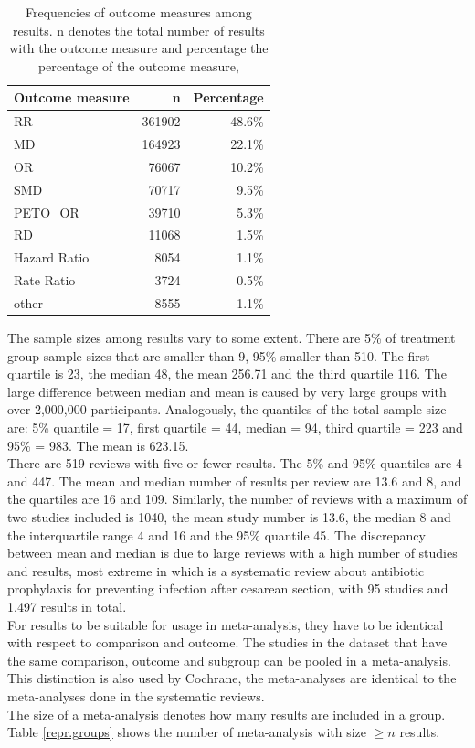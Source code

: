 \documentclass[11pt,a4paper,twoside]{book}\usepackage[]{graphicx}\usepackage[]{color}
\begin{document}
\begin{table}[ht]
\centering
\begingroup\footnotesize
\begin{tabular}{lrr}
  \hline
Outcome measure & n & Percentage \\ 
  \hline
RR & 361902 & 48.6\% \\ 
  MD & 164923 & 22.1\% \\ 
  OR & 76067 & 10.2\% \\ 
  SMD & 70717 & 9.5\% \\ 
  PETO\_OR & 39710 & 5.3\% \\ 
  RD & 11068 & 1.5\% \\ 
  Hazard Ratio & 8054 & 1.1\% \\ 
  Rate Ratio & 3724 & 0.5\% \\ 
  other & 8555 & 1.1\% \\ 
   \hline
\end{tabular}
\endgroup
\caption{Frequencies of outcome measures among results. n denotes the total number 
             of results with the outcome measure and percentage the percentage of the outcome measure,} 
\label{outcome.measure.frequencies}
\end{table}



The sample sizes among results vary to some extent. There are 5\% of treatment group sample sizes that are smaller than 9, 95\% smaller than 510. The first quartile is 23, the median 48, the mean 256.71 and the third quartile 116. The large difference between median and mean is caused by very large groups with over 2,000,000 participants. Analogously, the quantiles of the total sample size are: 5\% quantile = 17, first quartile = 44, median = 94, third quartile = 223 and 95\% = 983. The mean is 623.15. \\
There are 519 reviews with five or fewer results. The 5\% and 95\% quantiles are 4 and 447. The mean and median number of results per review are 13.6 and 8, and the quartiles are 16 and 109. Similarly, the number of reviews with a maximum of two studies included is 1040, the mean study number is 13.6, the median 8 and the interquartile range 4 and 16 and the 95\% quantile 45. The discrepancy between mean and median is due to large reviews with a high number of studies and results, most extreme in %
which is a systematic review about antibiotic prophylaxis for preventing infection after cesarean section, with 95 studies and 1,497 results in total.\\
For results to be suitable for usage in meta-analysis, they have to be identical with respect to comparison and outcome. The studies in the dataset that have the same comparison, outcome and subgroup can be pooled in a meta-analysis. This distinction is also used by Cochrane, \ie the meta-analyses are identical to the meta-analyses done in the systematic reviews.\\ %
The size of a meta-analysis denotes how many results are included in a group. Table \ref{repr.groups} shows the number of meta-analysis with size $\geq n$ results. 
\end{document}
